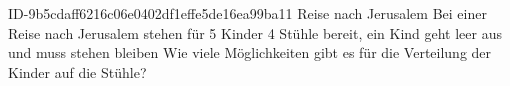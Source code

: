 \begin{exercise}
      {ID-9b5cdaff6216c06e0402df1effe5de16ea99ba11}
      {Reise nach Jerusalem}
  \ifproblem\problem
    Bei einer \glqq Reise nach Jerusalem\grqq{} stehen für 5 Kinder 4 Stühle
    bereit, ein Kind geht leer aus und muss stehen bleiben Wie viele
    Möglichkeiten gibt es für die Verteilung der Kinder auf die Stühle?
  \fi
\end{exercise}
